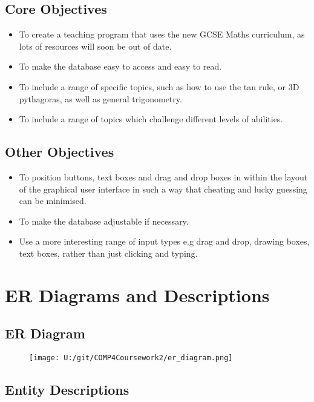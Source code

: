 \subsection{Core Objectives}

\begin{itemize}
	\item To create a teaching program that uses the new GCSE Maths curriculum, as lots of resources will soon be out of date. 
	\item To make the database easy to access and easy to read.
	\item To include a range of specific topics, such as how to use the tan rule, or 3D pythagoras, as well as general trigonometry.
	\item To include a range of topics which challenge different levels of abilities.
\end{itemize}

\subsection{Other Objectives}

\begin{itemize}
	\item To position buttons, text boxes and drag and drop boxes in within the layout of the graphical user interface in such a way that cheating and lucky guessing can be minimised.
	\item To make the database adjustable if necessary.
	\item Use a more interesting range of input types e.g drag and drop, drawing boxes, text boxes, rather than just clicking and typing.
\end{itemize}

\section{ER Diagrams and Descriptions}

\subsection{ER Diagram}

\begin{figure}[H]
    \texttt{[image: U:/git/COMP4Coursework2/er\_diagram.png]}
    \label{fig:print_function_result}
\end{figure}

\subsection{Entity Descriptions}

